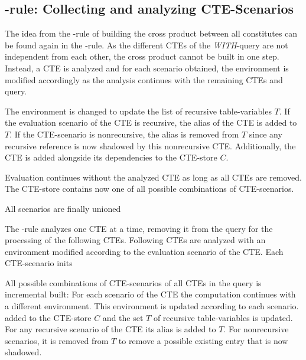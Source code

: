 \subsection{\RCTE-rule: Collecting and analyzing CTE-Scenarios}

The idea from the \REXPR-rule of building the cross product between all constitutes can be found again in the \RCTE-rule. As the different CTEs of the \textit{WITH}-query are not independent from each other, the cross product cannot be built in one step. Instead, a CTE is analyzed and for each scenario obtained, the environment is modified accordingly as the analysis continues with the remaining CTEs and query.

The environment is changed to update the list of recursive table-variables $T$. If the evaluation scenario of the CTE is recursive, the alias of the CTE is added to $T$. If the CTE-scenario is nonrecursive, the alias is removed from $T$ since any recursive reference is now shadowed by this nonrecursive CTE. Additionally, the CTE is added alongside its dependencies to the CTE-store $C$.

Evaluation continues without the analyzed CTE as long as all CTEs are removed. The CTE-store contains now one of all possible combinations of CTE-scenarios. 

All scenarios are finally unioned

The \RCTE-rule analyzes one CTE at a time, removing it from the query for the processing of the following CTEs. Following CTEs are analyzed with an environment modified according to the evaluation scenario of the CTE. Each CTE-scenario inits 

All possible combinations of CTE-scenarios of all CTEs in the query is incremental built: For each scenario of the CTE the computation continues with a different environment. This environment is updated according to each scenario.
added to the CTE-store $C$ and the set $T$ of recursive table-variables is updated. For any recursive scenario of the CTE its alias is added to $T$. For nonrecursive scenarios, it is removed from $T$ to remove a possible existing entry that is now shadowed.



